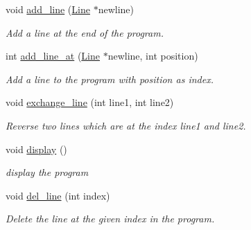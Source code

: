 \begin{DoxyCompactItemize}
\mbox{\label{class_program_a90e1c506dffd5756133f70811f6117d9}} 
void \mbox{\hyperlink{class_program_a90e1c506dffd5756133f70811f6117d9}{add\+\_\+line}} (\mbox{\hyperlink{class_line}{Line}} $\ast$newline)
\begin{DoxyCompactList}\small\item\em Add a line at the end of the program. \end{DoxyCompactList}\item 
\mbox{\label{class_program_a7adb0709f1a9f3ed63e861cc7f02d308}} 
int \mbox{\hyperlink{class_program_a7adb0709f1a9f3ed63e861cc7f02d308}{add\+\_\+line\+\_\+at}} (\mbox{\hyperlink{class_line}{Line}} $\ast$newline, int position)
\begin{DoxyCompactList}\small\item\em Add a line to the program with position as index. \end{DoxyCompactList}\item 
\mbox{\label{class_program_aabea8add836e10a384b63e2f293ece23}} 
void \mbox{\hyperlink{class_program_aabea8add836e10a384b63e2f293ece23}{exchange\+\_\+line}} (int line1, int line2)
\begin{DoxyCompactList}\small\item\em Reverse two lines which are at the index line1 and line2. \end{DoxyCompactList}\item 
\mbox{\label{class_program_a3c1399ac5ed69e5c152f1a2cc1e644d4}} 
void \mbox{\hyperlink{class_program_a3c1399ac5ed69e5c152f1a2cc1e644d4}{display}} ()
\begin{DoxyCompactList}\small\item\em display the program \end{DoxyCompactList}\item 
\mbox{\label{class_program_a1adce5c1fc414a378e4b87f1d4b535e1}} 
void \mbox{\hyperlink{class_program_a1adce5c1fc414a378e4b87f1d4b535e1}{del\+\_\+line}} (int index)
\begin{DoxyCompactList}\small\item\em Delete the line at the given index in the program. \end{DoxyCompactList}\item 
\mbox{\label{class_program_ae897b48e1e1be99578440eb6a38a3a0d}} 

\end{DoxyCompactItemize}
